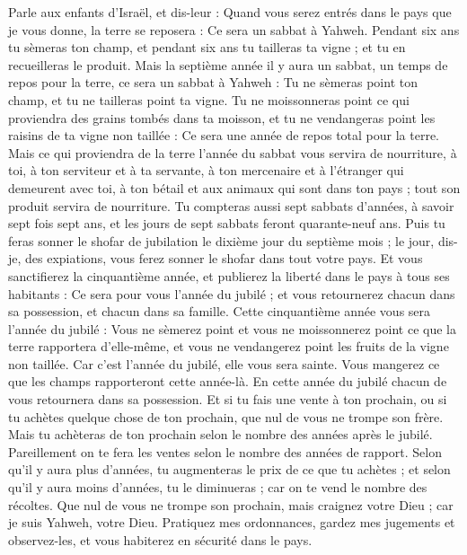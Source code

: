 \begin{multicols}{2}
Parle aux enfants d'Israël, et dis-leur : Quand vous serez entrés dans le pays que je vous donne, la terre se reposera : Ce sera un sabbat à Yahweh.
Pendant six ans tu sèmeras ton champ, et pendant six ans tu tailleras ta vigne ; et tu en recueilleras le produit.
Mais la septième année il y aura un sabbat, un temps de repos pour la terre, ce sera un sabbat à Yahweh : Tu ne sèmeras point ton champ, et tu ne tailleras point ta vigne.
Tu ne moissonneras point ce qui proviendra des grains tombés dans ta moisson, et tu ne vendangeras point les raisins de ta vigne non taillée : Ce sera une année de repos total pour la terre.
Mais ce qui proviendra de la terre l'année du sabbat vous servira de nourriture, à toi, à ton serviteur et à ta servante, à ton mercenaire et à l'étranger qui demeurent avec toi,
à ton bétail et aux animaux qui sont dans ton pays ; tout son produit servira de nourriture.
Tu compteras aussi sept sabbats d'années, à savoir sept fois sept ans, et les jours de sept sabbats feront quarante-neuf ans.
Puis tu feras sonner le shofar de jubilation le dixième jour du septième mois ; le jour, dis-je, des expiations, vous ferez sonner le shofar dans tout votre pays.
Et vous sanctifierez la cinquantième année, et publierez la liberté dans le pays à tous ses habitants : Ce sera pour vous l'année du jubilé ; et vous retournerez chacun dans sa possession, et chacun dans sa famille.
Cette cinquantième année vous sera l'année du jubilé : Vous ne sèmerez point et vous ne moissonnerez point ce que la terre rapportera d'elle-même, et vous ne vendangerez point les fruits de la vigne non taillée.
Car c'est l'année du jubilé, elle vous sera sainte. Vous mangerez ce que les champs rapporteront cette année-là.
En cette année du jubilé chacun de vous retournera dans sa possession.
Et si tu fais une vente à ton prochain, ou si tu achètes quelque chose de ton prochain, que nul de vous ne trompe son frère.
Mais tu achèteras de ton prochain selon le nombre des années après le jubilé. Pareillement on te fera les ventes selon le nombre des années de rapport.
Selon qu'il y aura plus d'années, tu augmenteras le prix de ce que tu achètes ; et selon qu'il y aura moins d'années, tu le diminueras ; car on te vend le nombre des récoltes.
Que nul de vous ne trompe son prochain, mais craignez votre Dieu ; car je suis Yahweh, votre Dieu.
Pratiquez mes ordonnances, gardez mes jugements et observez-les, et vous habiterez en sécurité dans le pays.

\end{multicols}
